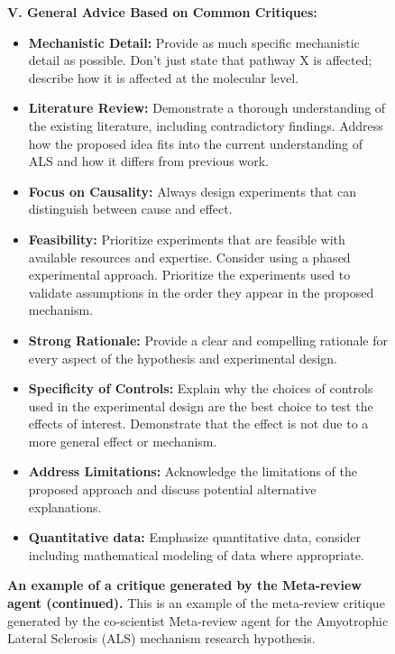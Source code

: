 \begin{figure}[htbp!]
\begin{tcolorbox}
\textbf{V. General Advice Based on Common Critiques:}
\begin{itemize}
    \item \textbf{Mechanistic Detail:} Provide as much specific mechanistic detail as possible. Don't just state that pathway X is affected; describe how it is affected at the molecular level.
    \item \textbf{Literature Review:} Demonstrate a thorough understanding of the existing literature, including contradictory findings. Address how the proposed idea fits into the current understanding of ALS and how it differs from previous work.
    \item \textbf{Focus on Causality:} Always design experiments that can distinguish between cause and effect.
    \item \textbf{Feasibility:} Prioritize experiments that are feasible with available resources and expertise. Consider using a phased experimental approach. Prioritize the experiments used to validate assumptions in the order they appear in the proposed mechanism.
    \item \textbf{Strong Rationale:} Provide a clear and compelling rationale for every aspect of the hypothesis and experimental design.
    \item \textbf{Specificity of Controls:} Explain why the choices of controls used in the experimental design are the best choice to test the effects of interest. Demonstrate that the effect is not due to a more general effect or mechanism.
    \item \textbf{Address Limitations:} Acknowledge the limitations of the proposed approach and discuss potential alternative explanations.
    \item \textbf{Quantitative data:} Emphasize quantitative data, consider including mathematical modeling of data where appropriate.
\end{itemize}
\end{tcolorbox}
\vspace{0.1cm}
\caption{\textbf{An example of a critique generated by the Meta-review agent (continued).} This is an example of the meta-review critique generated by the co-scientist Meta-review agent for the Amyotrophic Lateral Sclerosis (ALS) mechanism research hypothesis.}
\label{fig:ex_meta_critique_2}
\end{figure}




